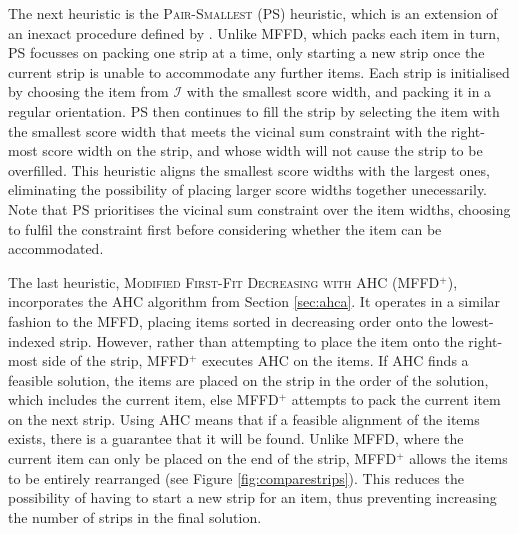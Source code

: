 \documentclass[runningheads]{llncs}
\begin{document}
The next heuristic is the \textsc{Pair-Smallest} (PS) heuristic, which is an extension of an inexact procedure defined by \cite{lewis2011}. Unlike MFFD, which packs each item in turn, PS focusses on packing one strip at a time, only starting a new strip once the current strip is unable to accommodate any further items. Each strip is initialised by choosing the item from $\mathcal{I}$ with the smallest score width, and packing it in a regular orientation. PS then continues to fill the strip by selecting the item with the smallest score width that meets the vicinal sum constraint with the right-most score width on the strip, and whose width will not cause the strip to be overfilled. This heuristic aligns the smallest score widths with the largest ones, eliminating the possibility of placing larger score widths together unecessarily. Note that PS prioritises the vicinal sum constraint over the item widths, choosing to fulfil the constraint first before considering whether the item can be accommodated.

The last heuristic, \textsc{Modified First-Fit Decreasing with AHC} (MFFD$^+$), incorporates the AHC algorithm from Section \ref{sec:ahca}. It operates in a similar fashion to the MFFD, placing items sorted in decreasing order onto the lowest-indexed strip. However, rather than attempting to place the item onto the right-most side of the strip, MFFD$^+$ executes AHC on the items. If AHC finds a feasible solution, the items are placed on the strip in the order of the solution, which includes the current item, else MFFD$^+$ attempts to pack the current item on the next strip. Using AHC means that if a feasible alignment of the items exists, there is a guarantee that it will be found. Unlike MFFD, where the current item can only be placed on the end of the strip, MFFD$^+$ allows the items to be entirely rearranged (see Figure \ref{fig:comparestrips}). This reduces the possibility of having to start a new strip for an item, thus preventing increasing the number of strips in the final solution. 
\end{document}
